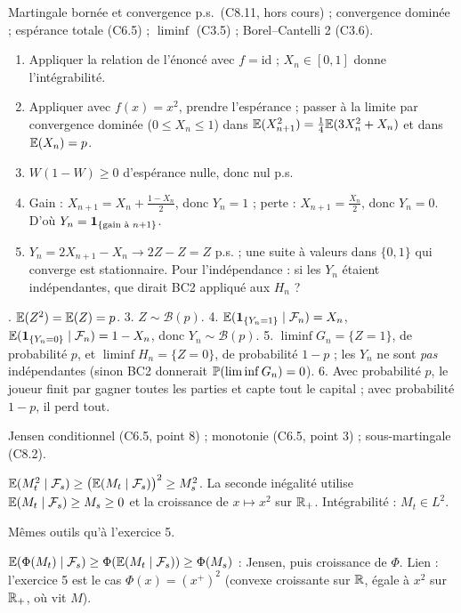 \documentclass[11pt,a4paper]{article}
\begin{document}
\begin{exo}
\outils Martingale bornée et convergence p.s.\ (C8.11, hors cours) ; convergence dominée ; espérance totale (C6.5) ; $\liminf$ (C3.5) ;
Borel--Cantelli 2 (C3.6).

\meth
\begin{enumerate}
  \item Appliquer la relation de l'énoncé avec $f=\mathrm{id}$ ; $X_n\in[0,1]$ donne l'intégrabilité.
  \item Appliquer avec $f(x)=x^2$, prendre l'espérance ; passer à la limite par convergence dominée ($0\le X_n\le1$) dans
  $\mathbb{E}(X_{n+1}^2)=\frac14\mathbb{E}(3X_n^2+X_n)$ et dans $\mathbb{E}(X_n)=p$.
  \item $W(1-W)\ge0$ d'espérance nulle, donc nul p.s.
  \item Gain : $X_{n+1}=X_n+\frac{1-X_n}2$, donc $Y_n=1$ ; perte : $X_{n+1}=\frac{X_n}2$, donc $Y_n=0$. D'où $Y_n=\mathbf{1}_{\{\text{gain à }n+1\}}$.
  \item $Y_n=2X_{n+1}-X_n\to2Z-Z=Z$ p.s. ; une suite à valeurs dans $\{0,1\}$ qui converge est stationnaire.
  Pour l'indépendance : si les $Y_n$ étaient indépendantes, que dirait BC2 appliqué aux $H_n$ ?
\end{enumerate}

. $\mathbb{E}(Z^2)=\mathbb{E}(Z)=p$. 3. $Z\sim\mathcal B(p)$. 4. $\mathbb{E}(\mathbf{1}_{\{Y_n=1\}}\mid\mathcal{F}_n)=X_n$, $\mathbb{E}(\mathbf{1}_{\{Y_n=0\}}\mid\mathcal{F}_n)=1-X_n$, donc $Y_n\sim\mathcal B(p)$.
5. $\liminf G_n=\{Z=1\}$, de probabilité $p$, et $\liminf H_n=\{Z=0\}$, de probabilité $1-p$ ; les $Y_n$ ne sont \emph{pas} indépendantes (sinon BC2 donnerait $\mathbb{P}(\liminf G_n)=0$).
6. Avec probabilité $p$, le joueur finit par gagner toutes les parties et capte tout le capital ; avec probabilité $1-p$, il perd tout.
\end{exo}

\begin{exo}
\outils Jensen conditionnel (C6.5, point 8) ; monotonie (C6.5, point 3) ; sous-martingale (C8.2).

\meth $\mathbb{E}(M_t^2\mid\mathcal{F}_s)\ge\bigl(\mathbb{E}(M_t\mid\mathcal{F}_s)\bigr)^2\ge M_s^2$. La seconde inégalité utilise $\mathbb{E}(M_t\mid\mathcal{F}_s)\ge M_s\ge0$ et la
croissance de $x\mapsto x^2$ sur $\mathbb{R}_+$. Intégrabilité : $M_t\in L^2$.
\end{exo}

\begin{exo}
\outils Mêmes outils qu'à l'exercice 5.

\meth $\mathbb{E}(\Phi(M_t)\mid\mathcal{F}_s)\ge\Phi(\mathbb{E}(M_t\mid\mathcal{F}_s))\ge\Phi(M_s)$ : Jensen, puis croissance de $\Phi$.
Lien : l'exercice 5 est le cas $\Phi(x)=(x^+)^2$ (convexe croissante sur $\mathbb{R}$, égale à $x^2$ sur $\mathbb{R}_+$, où vit $M$).
\end{exo}
\end{document}
